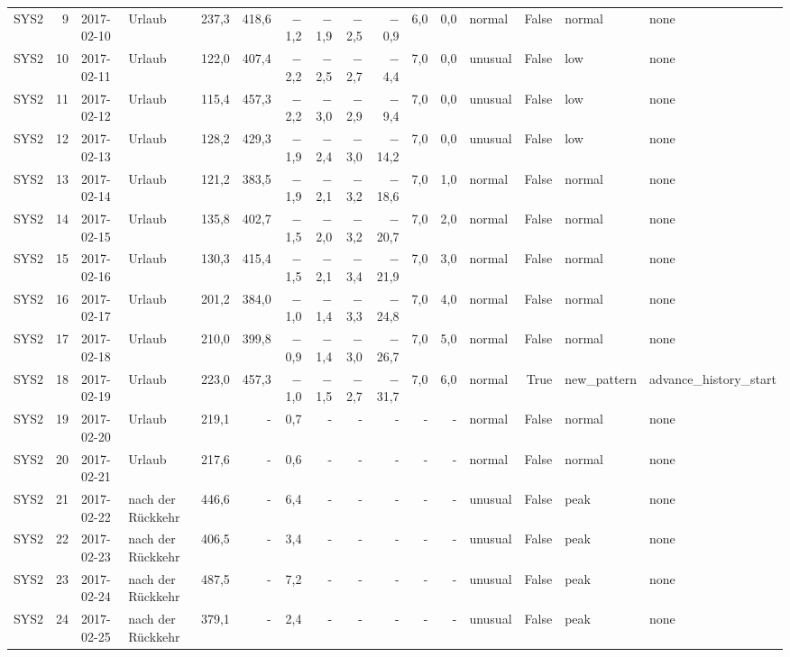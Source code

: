 \begin{tabular}{lrllrrrrrrrrlrll}
SYS2 & 9 & 2017-02-10 & Urlaub & 237,3 & 418,6 & $-$1,2 & $-$1,9 & $-$2,5 & $-$0,9 & 6,0 & 0,0 & normal & False & normal & none \\
SYS2 & 10 & 2017-02-11 & Urlaub & 122,0 & 407,4 & $-$2,2 & $-$2,5 & $-$2,7 & $-$4,4 & 7,0 & 0,0 & unusual & False & low & none \\
SYS2 & 11 & 2017-02-12 & Urlaub & 115,4 & 457,3 & $-$2,2 & $-$3,0 & $-$2,9 & $-$9,4 & 7,0 & 0,0 & unusual & False & low & none \\
SYS2 & 12 & 2017-02-13 & Urlaub & 128,2 & 429,3 & $-$1,9 & $-$2,4 & $-$3,0 & $-$14,2 & 7,0 & 0,0 & unusual & False & low & none \\
SYS2 & 13 & 2017-02-14 & Urlaub & 121,2 & 383,5 & $-$1,9 & $-$2,1 & $-$3,2 & $-$18,6 & 7,0 & 1,0 & normal & False & normal & none \\
SYS2 & 14 & 2017-02-15 & Urlaub & 135,8 & 402,7 & $-$1,5 & $-$2,0 & $-$3,2 & $-$20,7 & 7,0 & 2,0 & normal & False & normal & none \\
SYS2 & 15 & 2017-02-16 & Urlaub & 130,3 & 415,4 & $-$1,5 & $-$2,1 & $-$3,4 & $-$21,9 & 7,0 & 3,0 & normal & False & normal & none \\
SYS2 & 16 & 2017-02-17 & Urlaub & 201,2 & 384,0 & $-$1,0 & $-$1,4 & $-$3,3 & $-$24,8 & 7,0 & 4,0 & normal & False & normal & none \\
SYS2 & 17 & 2017-02-18 & Urlaub & 210,0 & 399,8 & $-$0,9 & $-$1,4 & $-$3,0 & $-$26,7 & 7,0 & 5,0 & normal & False & normal & none \\
SYS2 & 18 & 2017-02-19 & Urlaub & 223,0 & 457,3 & $-$1,0 & $-$1,5 & $-$2,7 & $-$31,7 & 7,0 & 6,0 & normal & True & new\_pattern & advance\_history\_start \\
SYS2 & 19 & 2017-02-20 & Urlaub & 219,1 & - & 0,7 & - & - & - & - & - & normal & False & normal & none \\
SYS2 & 20 & 2017-02-21 & Urlaub & 217,6 & - & 0,6 & - & - & - & - & - & normal & False & normal & none \\
SYS2 & 21 & 2017-02-22 & nach der Rückkehr & 446,6 & - & 6,4 & - & - & - & - & - & unusual & False & peak & none \\
SYS2 & 22 & 2017-02-23 & nach der Rückkehr & 406,5 & - & 3,4 & - & - & - & - & - & unusual & False & peak & none \\
SYS2 & 23 & 2017-02-24 & nach der Rückkehr & 487,5 & - & 7,2 & - & - & - & - & - & unusual & False & peak & none \\
SYS2 & 24 & 2017-02-25 & nach der Rückkehr & 379,1 & - & 2,4 & - & - & - & - & - & unusual & False & peak & none \\

\end{tabular}
